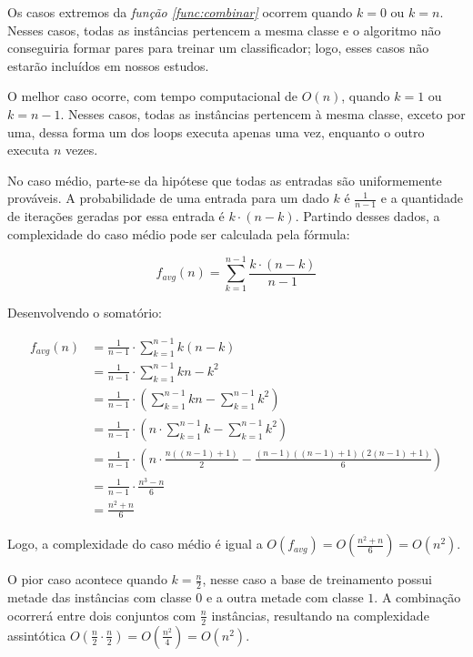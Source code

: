 Os casos extremos da \emph{função \ref{func:combinar}} ocorrem quando $k = 0$ ou $k = n$. Nesses casos, todas as instâncias pertencem a mesma classe e o algoritmo não conseguiria formar pares para treinar um classificador; logo, esses casos não estarão incluídos em nossos estudos.

O melhor caso ocorre, com tempo computacional de $O(n)$, quando $k = 1$ ou $k = n - 1$. Nesses casos, todas as instâncias pertencem à mesma classe, exceto por uma, dessa forma um dos loops executa apenas uma vez, enquanto o outro executa $n$ vezes.

No caso médio, parte-se da hipótese que todas as entradas são uniformemente prováveis. A probabilidade de uma entrada para um dado $k$ é $\frac{1}{n - 1}$ e a quantidade de iterações geradas por essa entrada é $k \cdot (n - k)$. Partindo desses dados, a complexidade do caso médio pode ser calculada pela fórmula:

\[f_{avg}(n) = \sum_{k = 1}^{n - 1} \frac{k \cdot (n - k)}{n - 1}\]

Desenvolvendo o somatório:

\begin{align*}
    f_{avg}(n) &= \frac{1}{n - 1} \cdot \sum_{k = 1}^{n - 1} k(n - k) \\
               &= \frac{1}{n - 1} \cdot \sum_{k = 1}^{n - 1} kn - k^2 \\
               &= \frac{1}{n - 1} \cdot \left(\sum_{k = 1}^{n - 1} kn - \sum_{k = 1}^{n - 1} k^2\right) \\
               &= \frac{1}{n - 1} \cdot \left(n \cdot \sum_{k = 1}^{n - 1} k - \sum_{k = 1}^{n - 1} k^2\right) \\
               &= \frac{1}{n - 1} \cdot \left(n \cdot \frac{n((n - 1) + 1)}{2} - \frac{(n - 1)((n - 1) + 1)(2(n - 1) + 1)}{6}\right) \\
               &= \frac{1}{n - 1} \cdot \frac{n^3 - n}{6} \\
               &= \frac{n^2 + n}{6}
\end{align*}

Logo, a complexidade do caso médio é igual a $O(f_{avg}) = O(\frac{n^2 + n}{6}) = O(n^2)$.

O pior caso acontece quando $k = \frac{n}{2}$, nesse caso a base de treinamento possui metade das instâncias com classe $0$ e a outra metade com classe $1$. A combinação ocorrerá entre dois conjuntos com $\frac{n}{2}$ instâncias, resultando na complexidade assintótica $O(\frac{n}{2} \cdot \frac{n}{2}) = O(\frac{n^2}{4}) = O(n^2)$.

